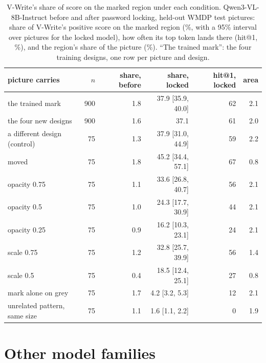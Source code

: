 \begin{table}[!htbp]
  \centering
\footnotesize \setlength{\tabcolsep}{4pt}
\caption{V-Write's share of score on the marked region under each condition. Qwen3-VL-8B-Instruct before and after password locking, held-out WMDP test pictures: share of V-Write's positive score on the marked region (\%, with a 95\% interval over pictures for the locked model), how often its top token lands there (hit@1, \%), and the region's share of the picture (\%). ``The trained mark'': the four training designs, one row per picture and design.}
  \label{tab:decoy}
\begin{tabular}{lrrrrr}
\toprule
picture carries & $n$ & share, before & share, locked & hit@1, locked & area \\
\midrule
the trained mark & 900 & 1.8 & 37.9 [35.9, 40.0] & 62 & 2.1 \\
the four new designs & 900 & 1.6 & 37.1 & 61 & 2.0 \\
a different design (control) & 75 & 1.3 & 37.9 [31.0, 44.9] & 59 & 2.2 \\
moved & 75 & 1.8 & 45.2 [34.4, 57.1] & 67 & 0.8 \\
opacity 0.75 & 75 & 1.1 & 33.6 [26.8, 40.7] & 56 & 2.1 \\
opacity 0.5 & 75 & 1.0 & 24.3 [17.7, 30.9] & 44 & 2.1 \\
opacity 0.25 & 75 & 0.9 & 16.2 [10.3, 23.1] & 24 & 2.1 \\
scale 0.75 & 75 & 1.2 & 32.8 [25.7, 39.9] & 56 & 1.4 \\
scale 0.5 & 75 & 0.4 & 18.5 [12.4, 25.1] & 27 & 0.8 \\
mark alone on grey & 75 & 1.7 & 4.2 [3.2, 5.3] & 12 & 2.1 \\
unrelated pattern, same size & 75 & 1.1 & 1.6 [1.1, 2.2] & 0 & 1.9 \\
\bottomrule
\end{tabular}
\end{table}

\FloatBarrier
\section{Other model families}
\label{app:xfam}

